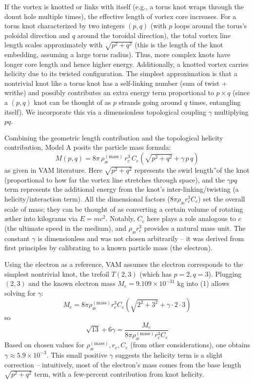 If the vortex is knotted or links with itself (e.g., a torus knot wraps through the donut hole multiple times), the effective length of vortex core increases. For a torus knot characterized by two integers $(p, q)$ (with $p$ loops around the torus's poloidal direction and $q$ around the toroidal direction), the total vortex line length scales approximately with $\sqrt{p^2+q^2}$ (this is the length of the knot embedding, assuming a large torus radius). Thus, more complex knots have longer core length and hence higher energy. Additionally, a knotted vortex carries helicity due to its twisted configuration. The simplest approximation is that a nontrivial knot like a torus knot has a self-linking number (sum of twist + writhe) and possibly contributes an extra energy term proportional to $p \times q$ (since a $(p,q)$ knot can be thought of as $p$ strands going around $q$ times, entangling itself). We incorporate this via a dimensionless topological coupling $\gamma$ multiplying $p q$.

Combining the geometric length contribution and the topological helicity contribution, Model A posits the particle mass formula:
\begin{equation}
    \boxed{  M(p,q) = 8\pi\,\rho_{\text{\ae}}^{(\text{mass})}\,r_c^3\,C_e \left(\sqrt{p^2 + q^2} + \gamma\, p\,q\right)     }
\end{equation}
as given in VAM literature. Here $\sqrt{p^2+q^2}$ represents the \grqq swirl length\textquotedblright of the knot (proportional to how far the vortex line stretches through space), and the $\gamma p q$ term represents the additional energy from the knot's inter-linking/twisting (a helicity/interaction term). All the dimensional factors ($8\pi \rho_{\text{\ae}} r_c^3 C_e$) set the overall scale of mass; they can be thought of as converting a certain volume of rotating æther into kilograms via $E=mc^2$. Notably, $C_e$ here plays a role analogous to $c$ (the ultimate speed in the medium), and $\rho_{\text{\ae}} r_c^3$ provides a natural mass unit. The constant $\gamma$ is dimensionless and was not chosen arbitrarily – it was derived from first principles by calibrating to a known particle mass (the electron).

Using the electron as a reference, VAM assumes the electron corresponds to the simplest nontrivial knot, the trefoil $T(2,3)$ (which has $p=2,q=3$). Plugging $(2,3)$ and the known electron mass $M_e = 9.109\times10^{-31}$ kg into (1) allows solving for $\gamma$:
\[
    M_e = 8\pi \rho_{\text{\ae}}^{(\text{mass})} r_c^3 C_e \left(\sqrt{2^2+3^2} + \gamma \cdot 2\cdot3\right)
\]
so
\[
    \sqrt{13} + 6\gamma = \frac{M_e}{8\pi \rho_{\text{\ae}}^{(\text{mass})} r_c^3 C_e}
\]
Based on chosen values for $\rho_{\text{\ae}}^{(\text{mass})}, r_c, C_e$ (from other considerations), one obtains $\gamma \approx 5.9\times10^{-3}$. This small positive $\gamma$ suggests the helicity term is a slight correction -- intuitively, most of the electron's mass comes from the base length $\sqrt{p^2+q^2}$ term, with a few-percent contribution from knot helicity.

